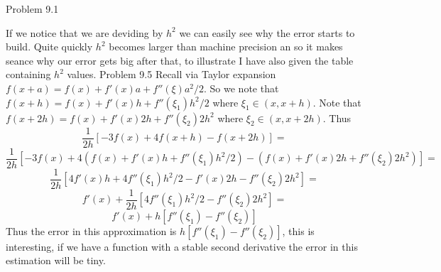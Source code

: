 \documentclass[12pt]{article}
\makeatletter
\theoremstyle{homework}
\newenvironment{exercise}[1]
{\def\@currentlabel{#1}\exercisecore}
{\endexercisecore}
\makeatother
\begin{document}
\begin{exercise}
5
Problem 9.1
\end{exercise}


If we notice that we are deviding by $h^2$ we can easily see why the error starts to build.  Quite quickly $h^2$ becomes larger than machine precision an so it makes seance why our error gets big after that, to illustrate I have also given the table containing $h^2$ values.
\begin{exercise}
6
Problem 9.5
\end{exercise}
Recall via Taylor expansion $f(x+a)=f(x)+f'(x)a+f''(\xi)a^2/2$.  So we note that $f(x+h)=f(x)+f'(x)h+f''(\xi_1)h^2/2$ where $\xi_1\in(x,x+h)$.  Note that $f(x+2h)=f(x)+f'(x)2h+f''(\xi_2)2h^2$ where $\xi_2\in(x,x+2h)$.  Thus
$$\frac{1}{2h}[-3f(x)+4f(x+h)-f(x+2h)]=$$
$$\frac{1}{2h}[-3f(x)+4(f(x)+f'(x)h+f''(\xi_1)h^2/2)-(f(x)+f'(x)2h+f''(\xi_2)2h^2)]=$$
$$\frac{1}{2h}[4f'(x)h+4f''(\xi_1)h^2/2-f'(x)2h-f''(\xi_2)2h^2]=$$
$$f'(x)+\frac{1}{2h}[4f''(\xi_1)h^2/2-f''(\xi_2)2h^2]=$$
$$f'(x)+h[f''(\xi_1)-f''(\xi_2)]$$
Thus the error in this approximation is $h[f''(\xi_1)-f''(\xi_2)]$, this is interesting, if we have a function with a stable second derivative the error in this estimation will be tiny.
\end{document}
